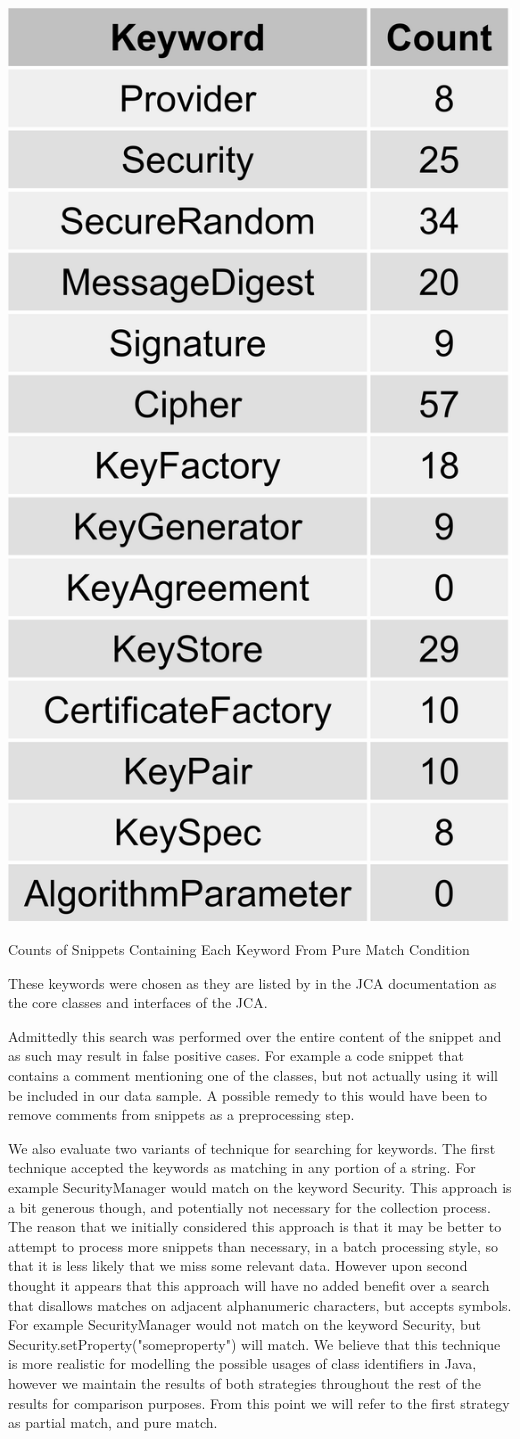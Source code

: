 \documentclass[10pt, conference]{IEEEtran}
\begin{document}
\begin{table}[h]
\begin{center}
\includegraphics[width=0.5\linewidth]{KeywordCounts.png}
\caption{Counts of Snippets Containing Each Keyword From Pure Match Condition \label{table:keywordCount}}
\end{center}
\end{table}

These keywords were chosen as they are listed by in the JCA documentation \cite{JCA} as the core classes and interfaces of the JCA.

Admittedly this search was performed over the entire content of the snippet and as such may result in false positive cases. For example a code snippet that contains a comment mentioning one of the classes, but not actually using it will be included in our data sample. A possible remedy to this would have been to remove comments from snippets as a preprocessing step. 


We also evaluate two variants of technique for searching for keywords. The first technique accepted the keywords as matching in any portion of a string. For example SecurityManager would match on the keyword Security. This approach is a bit generous though, and potentially not necessary for the collection process. The reason that we initially considered this approach is that it may be better to attempt to process more snippets than necessary, in a batch processing style, so that it is less likely that we miss some relevant data. However upon second thought it appears that this approach will have no added benefit over a search that disallows matches on adjacent alphanumeric characters, but accepts symbols. For example SecurityManager would not match on the keyword Security, but Security.setProperty("someproperty") will match. We believe that this technique is more realistic for modelling the possible usages of class identifiers in Java, however we maintain the results of both strategies throughout the rest of the results for comparison purposes. 
From this point we will refer to the first strategy as partial match, and pure match.
\end{document}
